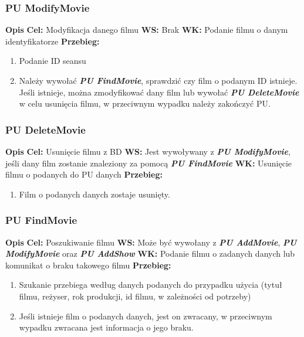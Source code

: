 \documentclass{article}
\begin{document}
	\subsubsection{PU ModifyMovie}
	\noindent \textbf{Opis}
	\newline \textbf{Cel: } Modyfikacja danego filmu
	\newline \textbf{WS: } Brak
	\newline \textbf{WK: } Podanie filmu o danym identyfikatorze
	\newline \textbf{Przebieg: }
	\begin{enumerate}
		\item Podanie ID seansu
		\item Należy wywołać \textit{\textbf{PU FindMovie}}, sprawdzić czy film o podanym ID istnieje. Jeśli istnieje, można zmodyfikować dany film lub wywołać \textit{\textbf{PU DeleteMovie}} w celu usunięcia filmu, w przeciwnym wypadku należy zakończyć PU.
	\end{enumerate}
	
	\subsubsection{PU DeleteMovie}
	\noindent \textbf{Opis }
	\newline \textbf{Cel:} Usunięcie filmu z BD
	\newline \textbf{WS: } Jest wywoływany z \textit{\textbf{PU ModifyMovie}}, jeśli dany film zostanie znaleziony za pomocą \textit{\textbf{PU FindMovie}}
	\newline \textbf{WK: } Usunięcie filmu o podanych do PU danych
	\newline \textbf{Przebieg: }
	\begin{enumerate}
		\item Film o podanych danych zostaje usunięty.
	\end{enumerate}
	
	\subsubsection{PU FindMovie}
	\noindent \textbf{Opis }
	\newline \textbf{Cel: } Poszukiwanie filmu
	\newline \textbf{WS: } Może być wywołany z \textit{\textbf{PU AddMovie}}, \textit{\textbf{PU ModifyMovie}} oraz \textit{\textbf{PU AddShow}}
	\newline \textbf{WK: } Podanie filmu o zadanych danych lub komunikat o braku takowego filmu
	\newline \textbf{Przebieg: }
	\begin{enumerate}
		\item Szukanie przebiega według danych podanych do przypadku użycia (tytuł filmu, reżyser, rok produkcji, id filmu, w zależności od potrzeby)
		\item Jeśli istnieje film o podanych danych, jest on zwracany, w przeciwnym wypadku zwracana jest informacja o jego braku.
	\end{enumerate}
	
\end{document}
